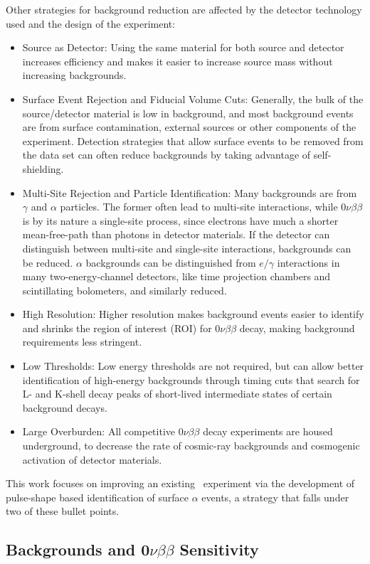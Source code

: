 Other strategies for background reduction are affected by the detector technology used and the design of the experiment:
\begin{itemize}
\item Source as Detector: Using the same material for both source and detector increases efficiency and makes it easier to increase source mass without increasing backgrounds.
\item Surface Event Rejection and Fiducial Volume Cuts: Generally, the bulk of the source/detector material is low in background, and most background events are from surface contamination, external sources or other components of the experiment. Detection strategies that allow surface events to be removed from the data set can often reduce backgrounds by taking advantage of self-shielding.
\item Multi-Site Rejection and Particle Identification: Many backgrounds are from $\gamma$ and $\alpha$ particles. The former often lead to multi-site interactions, while $0\nu\beta\beta$ is by its nature a single-site process, since electrons have much a shorter mean-free-path than photons in detector materials. If the detector can distinguish between multi-site and single-site interactions, backgrounds can be reduced. $\alpha$ backgrounds can be distinguished from $e/\gamma$ interactions in many two-energy-channel detectors, like time projection chambers and scintillating bolometers, and similarly reduced. 
\item High Resolution: Higher resolution makes background events easier to identify and shrinks the region of interest (ROI) for $0\nu\beta\beta$ decay, making background requirements less stringent.
\item Low Thresholds: Low energy thresholds are not required, but can allow better identification of high-energy backgrounds through timing cuts that search for L- and K-shell decay peaks of short-lived intermediate states of certain background decays. 
\item Large Overburden: All competitive $0\nu\beta\beta$ decay experiments are housed underground, to decrease the rate of cosmic-ray backgrounds and cosmogenic activation of detector materials. 
\end{itemize}
This work focuses on improving an existing \nonubb\ experiment via the development of pulse-shape based identification of surface $\alpha$ events, a strategy that falls under two of these bullet points. 

\subsection{Backgrounds and 0$\nu\beta\beta$ Sensitivity}


